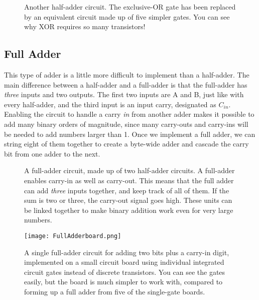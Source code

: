 \begin{figure}[!hb]
\begin{center}



\caption{Another half-adder circuit. The exclusive-OR gate has been replaced by an equivalent circuit made up of five simpler gates. You can see why XOR requires so many transistors!}
\end{center}
\end{figure}


\subsection*{Full Adder}

This type of adder is a little more difficult to implement than a half-adder. The main difference between a half-adder and a full-adder is that the full-adder has \emph{three} inputs and two outputs. The first two inputs are A and B, just like with every half-adder, and the third input is an input carry, designated as $C_{in}$. Enabling the circuit to handle a carry \emph{in} from another adder makes it possible to add many binary orders of magnitude, since many carry-outs and carry-ins will be needed to add numbers larger than 1. Once we implement a full adder, we can string eight of them together to create a byte-wide adder and cascade the carry bit from one adder to the next.
\bigskip

\begin{figure}[!hb]
\begin{center}

\caption{A full-adder circuit, made up of two half-adder circuits. A full-adder enables carry-in as well as carry-out. This means that the full adder can add \emph{three} inputs together, and keep track of all of them. If the sum is two or three, the carry-out signal goes high. These units can be linked together to make binary addition work even for very large numbers.}
\end{center}
\end{figure}


\begin{figure}[!ht]
\begin{center}
\texttt{[image: FullAdderboard.png]}
\caption{A single full-adder circuit for adding two bits plus a carry-in digit, implemented on a small circuit board using individual integrated circuit gates instead of discrete transistors. You can see the gates easily, but the board is much simpler to work with, compared to forming up a full adder from five of the single-gate boards.}
\end{center}
\end{figure}




